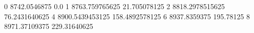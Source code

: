 0 8742.0546875 0.0
1 8763.759765625 21.705078125
2 8818.2978515625 76.2431640625
4 8900.5439453125 158.4892578125
6 8937.8359375 195.78125
8 8971.37109375 229.31640625
